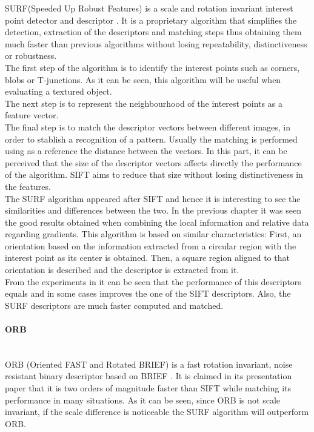 SURF(Speeded Up Robust Features) is a scale and rotation invariant interest point detector and descriptor \cite{surf}. 
It is a proprietary algorithm that simplifies the detection, extraction of the descriptors and matching steps thus obtaining them much faster than previous algorithms without losing repeatability, distinctiveness or robustness. 
\\

The first step of the algorithm is to identify the interest points such as corners, blobs or T-junctions. As it can be seen, this algorithm will be useful when evaluating a textured object. 
\\

The next step is to represent the neighbourhood of the interest points as a feature vector. 
\\

The final step is to match the descriptor vectors between different images, in order to stablish a recognition of a pattern. Usually the matching is performed using as a reference the distance between the vectors. 
In this part, it can be perceived that the size of the descriptor vectors affects directly the performance of the algorithm. SIFT aims to reduce that size without losing distinctiveness in the features. 
\\

The SURF algorithm appeared after SIFT and hence it is interesting to see the similarities and differences between the two. In the previous chapter it was seen the good results obtained when combining the local information and relative data regarding gradients. This algorithm is based on similar characteristics: 
First, an orientation based on the information extracted from a circular region with the interest point as its center is obtained. Then, a square region aligned to that orientation is described and the descriptor is extracted from it.  
\\

From the experiments in \cite{surf} it can be seen that the performance of this descriptors equals and in some cases improves the one of the SIFT descriptors. Also, the SURF descriptors are much faster computed and matched. 


\paragraph{ORB}\mbox{}\\

ORB (Oriented FAST and Rotated BRIEF) is a fast rotation invariant, noise resistant binary descriptor based on BRIEF \cite{orb}.
It is claimed in its presentation paper that it is two orders of magnitude faster than SIFT while matching its performance in many situations. As it can be seen, since ORB is not scale invariant, if the scale difference is noticeable the SURF algorithm will outperform ORB. 
\\

